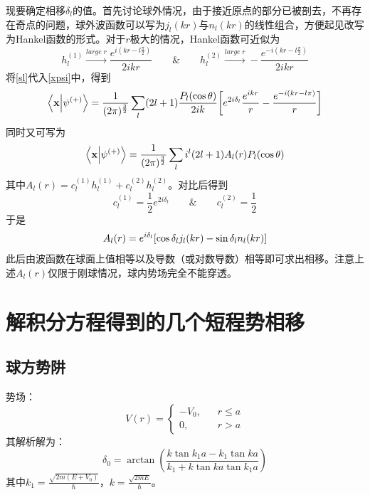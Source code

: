 \documentclass[hyperref]{ctexart}
\begin{document}
现要确定相移$\delta_l$的值。首先讨论球外情况，由于接近原点的部分已被剖去，不再存在奇点的问题，球外波函数可以写为$j_l(kr)$与$n_l(kr)$的线性组合，方便起见改写为Hankel函数的形式。对于$r$极大的情况，Hankel函数可近似为
\begin{equation}\label{Hankelr}
  h_l^{(1)}\xrightarrow{large\;r}\frac{e^{i(kr-l\frac{\pi}{2})}}{2ikr}\qquad\&\qquad h_l^{(2)}\xrightarrow{large\;r}-\frac{e^{-i(kr-l\frac{\pi}{2})}}{2ikr}
\end{equation}
将\eqref{sl}代入\eqref{xpsi}中，得到
\begin{equation}\label{xdel}
  \braket{\vb{x}}{\psi^{(+)}}=\frac{1}{(2\pi)^{\frac{3}{2}}}\sum_l(2l+1)\frac{P_l(\cos\theta)}{2ik}\bqty{e^{2i\delta_l}\frac{e^{ikr}}{r}-\frac{e^{-i(kr-l\pi)}}{r}}
\end{equation}
同时又可写为
\begin{equation}\label{xdelsy}
  \braket{\vb{x}}{\psi^{(+)}}=\frac{1}{(2\pi)^{\frac{3}{2}}}\sum_l i^l(2l+1)A_l(r)P_l(\cos\theta)
\end{equation}
其中$A_l(r)=c_l^{(1)} h_l^{(1)}+c_l^{(2)} h_l^{(2)}$。对比后得到
\begin{equation}\label{c}
  c_l^{(1)}=\frac{1}{2}e^{2i\delta_l}\qquad\&\qquad c_l^{(2)}=\frac{1}{2}
\end{equation}
于是
\begin{equation}\label{al}
  A_l(r)=e^{i\delta_l}\bqty{\cos\delta_lj_l(kr)-\sin\delta_ln_l(kr)}
\end{equation}
此后由波函数在球面上值相等以及导数（或对数导数）相等即可求出相移。注意上述$A_l(r)$仅限于刚球情况，球内势场完全不能穿透。
\section{解积分方程得到的几个短程势相移}
\subsection{球方势阱}
势场：
\begin{equation}\label{sq}
  V(r)=
\begin{cases}
  -V_0, & \;\;\;r\leq a \\
  0, &  \;\;\;r>a
\end{cases}
\end{equation}
其解析解为：
\begin{equation}\label{s}
  \delta_0=\arctan(\frac{k \tan k_1a-k_1\tan ka}{k_1+k\tan ka \tan k_1a})
\end{equation}
其中$\displaystyle k_1=\frac{\sqrt{2m(E+V_0)}}{\hbar}$，$\displaystyle k=\frac{\sqrt{2mE}}{\hbar}$。
\end{document}
